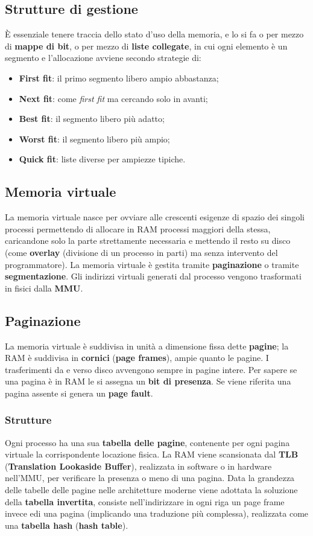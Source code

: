\documentclass{article}
\begin{document}
\subsection{Strutture di gestione} È essenziale tenere traccia dello stato d'uso della memoria, e lo si fa o per mezzo di \textbf{mappe di bit}, o per mezzo di \textbf{liste collegate}, in cui ogni elemento è un segmento e l'allocazione avviene secondo strategie di:
\begin{itemize}
    \item \textbf{First fit}: il primo segmento libero ampio abbastanza; 
    \item \textbf{Next fit}: come \textit{first fit} ma cercando solo in avanti;
    \item \textbf{Best fit}: il segmento libero più adatto;
    \item \textbf{Worst fit}: il segmento libero più ampio;
    \item \textbf{Quick fit}: liste diverse per ampiezze tipiche.
\end{itemize}

\subsection{Memoria virtuale} La memoria virtuale nasce per ovviare alle crescenti esigenze di spazio dei singoli processi permettendo di allocare in RAM processi maggiori della stessa, caricandone solo la parte strettamente necessaria e mettendo il resto su disco (come \textbf{overlay} (divisione di un processo in parti) ma senza intervento del programmatore). La memoria virtuale è gestita tramite \textbf{paginazione} o tramite \textbf{segmentazione}. Gli indirizzi virtuali generati dal processo vengono trasformati in fisici dalla \textbf{MMU}.

\subsection{Paginazione} La memoria virtuale è suddivisa in unità a dimensione fissa dette \textbf{pagine}; la RAM è suddivisa in \textbf{cornici} (\textbf{page frames}), ampie quanto le pagine. I trasferimenti da e verso disco avvengono sempre in  pagine intere. Per sapere se una pagina è in RAM le si assegna un \textbf{bit di presenza}. Se viene riferita una pagina assente si genera un \textbf{page fault}. 

\subsubsection{Strutture} Ogni processo ha una sua \textbf{tabella delle pagine}, contenente per ogni pagina virtuale la corrispondente locazione fisica.
La RAM viene scansionata dal \textbf{TLB} (\textbf{Translation Lookaside Buffer}), realizzata in software o in hardware nell'MMU, per verificare la presenza o meno di una pagina. Data la grandezza delle tabelle delle pagine nelle architetture moderne viene adottata la soluzione della \textbf{tabella invertita}, consiste nell'indirizzare in ogni riga un page frame invece edi una pagina (implicando una traduzione più complessa), realizzata come una \textbf{tabella hash} (\textbf{hash table}).
\end{document}
